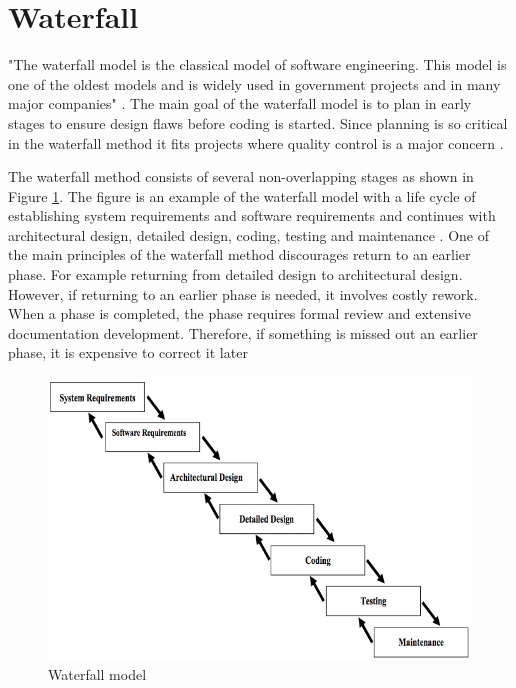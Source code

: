 \documentclass[UKenglish]{ifimaster}  %
\begin{document}
\section {Waterfall}
\label{sec:WP}
"The waterfall model is the classical model of software engineering. This model is one of the oldest models and is widely used in government projects and in many major companies" \parencite{munassar2010comparison}. The main goal of the waterfall model is to plan in early stages to ensure design flaws before coding is started. Since planning is so critical in the waterfall method it fits projects where quality control is a major concern  \parencite{munassar2010comparison}.

The waterfall method consists of several non-overlapping stages as shown in Figure \ref{fig:waterfall}. The figure is an example of the waterfall model with a life cycle of establishing system requirements and software requirements and continues with architectural design, detailed design, coding, testing and maintenance  \parencite{munassar2010comparison}. One of the main principles of the waterfall method discourages return to an earlier phase. For example returning from detailed design to architectural design. However, if returning to an earlier phase is needed, it involves costly rework. When a phase is completed, the phase requires formal review and extensive documentation development. Therefore, if something is missed out an earlier phase, it is expensive to correct it later  \parencite{munassar2010comparison}


\begin{figure}[ht!]
\centering
\includegraphics[scale=0.7]{Picture/waterfall.jpg}
\caption{Waterfall model}
\label{fig:waterfall} %
\end{figure}
\end{document}
